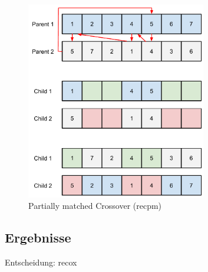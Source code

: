 \begin{figure}[h!]
  \centering
  \includegraphics[width=0.7\textwidth]{Figures/recpm.pdf}
  \caption{Partially matched Crossover (recpm)}\label{fig.recpm}
\end{figure}


\subsection{Ergebnisse}


Entscheidung: recox

